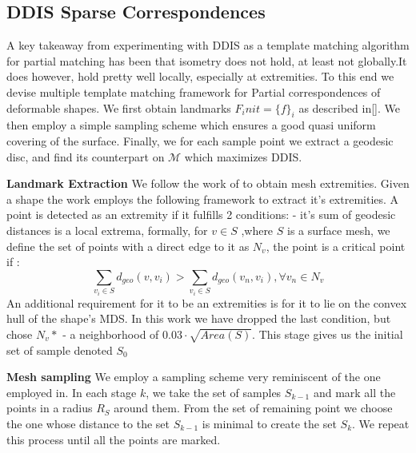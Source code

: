 \documentclass[10pt,twocolumn,letterpaper]{article}
\begin{document}
\subsection{DDIS Sparse Correspondences}
A key takeaway from experimenting with DDIS as a template matching algorithm for partial matching has been that isometry does not hold, at least not globally.It does however, hold pretty well locally, especially at extremities. To this end we devise  multiple template matching framework for Partial correspondences of deformable shapes. We first obtain landmarks $F_init=\{f\}_i$ as described in[]. 
We then employ a simple sampling scheme which ensures a good quasi uniform covering of the surface.
Finally, we for each sample point we extract a geodesic disc, and find its counterpart on $\mathcal{M}$ which maximizes DDIS. 

\textbf{Landmark Extraction}
We follow the work of\cite{katz2005mesh} to obtain mesh extremities. Given a shape the work employs the following framework to extract it's extremities. A point is detected as an extremity if it fulfills 2 conditions: - it's sum of geodesic distances is a local extrema, formally, for $v\in S$ ,where $S$ is a surface mesh, we define the set of points with a direct edge to it as $N_v$, the point is a critical point if :
\begin{equation}
\sum_{v_i\in S}d_{geo}(v,v_i)>\sum_{v_i\in S}d_{geo}(v_n,v_i), \forall v_n\in N_v
\end{equation}
An additional requirement for it to be an extremities is for it to lie on the convex hull of the shape's MDS. In this work we have dropped the last condition, but chose $N_v*$ - a neighborhood of $0.03\cdot \sqrt{Area(S)}$. This stage gives us the initial set of sample denoted $S_0$

\textbf{Mesh sampling}
We employ a sampling scheme very reminiscent of the one employed in\cite{sahillioǧlu2011coarse}. In each stage $k$, we take the set of samples $S_{k-1}$ and mark all the points in a radius $R_S$ around them. From the set of remaining point we choose the one whose distance to the set $S_{k-1}$ is minimal to create the set $S_k$. We repeat this process until all the points are marked.
\end{document}
